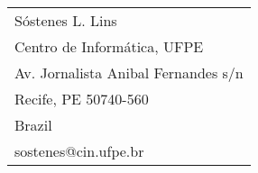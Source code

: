 

%
%

%


\vspace{5mm}
\begin{center}
\hspace{7mm}
\begin{tabular}{l}
   S\'ostenes L. Lins\\
   Centro de Inform\'atica, UFPE \\
   Av. Jornalista Anibal Fernandes s/n\\
   Recife, PE 50740-560 \\
   Brazil\\
   sostenes@cin.ufpe.br
\end{tabular}
\end{center}
